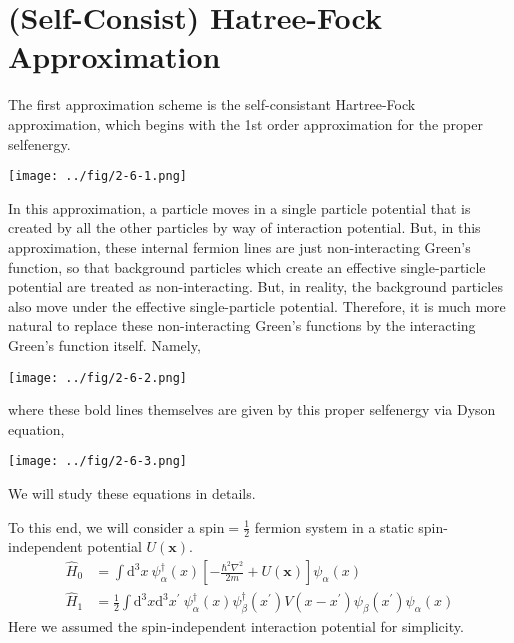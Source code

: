 \section{(Self-Consist) Hatree-Fock Approximation}%

The first approximation scheme is the self-consistant Hartree-Fock approximation, which begins with the 1st order approximation for the proper selfenergy.
\begin{center}
\texttt{[image: ../fig/2-6-1.png]}\label{Fig2.6.1}
\end{center}


In this approximation, a particle moves in a single particle potential that is created by all the other particles by way of interaction potential. But, in this approximation, these internal fermion lines are just non-interacting Green's function, so that background particles which create an effective single-particle potential are treated as non-interacting. But, in reality, the background particles also move under the effective single-particle potential. Therefore, it is much more natural to replace these non-interacting Green's functions by the interacting Green's function itself. Namely,
\begin{center} \texttt{[image: ../fig/2-6-2.png]} \label{Fig2.6.2}\end{center}
where these bold lines themselves are given by this proper selfenergy via Dyson equation,
\begin{center} \texttt{[image: ../fig/2-6-3.png]}\label{Fig2.6.3} \end{center}
We will study these equations in details.

To this end, we will consider a spin$=\frac{1}{2}$ fermion system in a static spin-independent potential $U(\mathbf{x})$.
\[\begin{split}
\hat{H}_{0} &= \int \mathrm{d}^{3}x \  \psi_{\alpha}^{\dagger}(x)\left[ -\frac{\hbar^{2}\nabla^{2}}{2m} + U(\mathbf{x}) \right] \psi_{\alpha}(x) \\
\hat{H}_{1} &= \frac{1}{2} \int \mathrm{d}^{3}x \mathrm{d}^{3}x^{'} \ \psi_{\alpha}^{\dagger}(x) \psi_{\beta}^{\dagger}(x^{'})V(x-x^{'})\psi_{\beta}(x^{'})\psi_{\alpha}(x)
\end{split}\]
Here we assumed the spin-independent interaction potential for simplicity.

